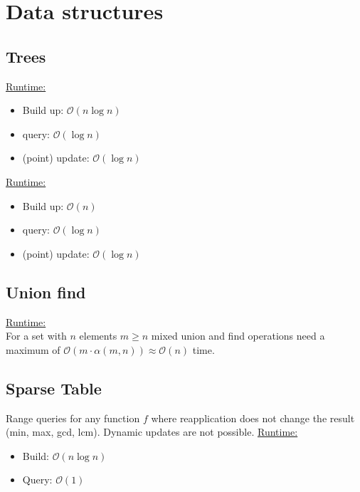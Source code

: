 \section{Data structures}

\subsection{Trees}

\underline{Runtime:}
\begin{itemize}
\item Build up: $\mathcal{O}(n\log n)$
\item query: $\mathcal{O}(\log n)$
\item (point) update: $\mathcal{O}(\log n)$
\end{itemize}


\underline{Runtime:}
\begin{itemize}
\item Build up: $\mathcal{O}(n)$
\item query: $\mathcal{O}(\log n)$
\item (point) update: $\mathcal{O}(\log n)$
\end{itemize}

\subsection{Union find}
\underline{Runtime:}\\
For a set with $n$ elements $m \geq n$ mixed union and find operations need a maximum of $\mathcal{O}(m \cdot \alpha(m, n)) \approx \mathcal{O}(n)$ time.

\subsection{Sparse Table}
Range queries for any function $f$ where reapplication does not change the result (min, max, gcd, lcm). Dynamic updates are not possible.
\underline{Runtime:}
\begin{itemize}
	\item Build: $\mathcal{O}(n \log n)$
	\item Query: $\mathcal{O}(1)$
\end{itemize}

